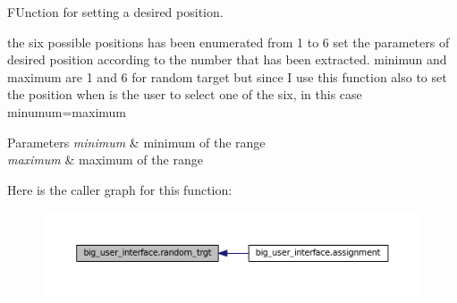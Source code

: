 F\+Unction for setting a desired position. 

the six possible positions has been enumerated from 1 to 6 set the parameters of desired position according to the number that has been extracted. minimun and maximum are 1 and 6 for random target but since I use this function also to set the position when is the user to select one of the six, in this case minumum=maximum 
\begin{DoxyParams}{Parameters}
{\em minimum} & minimum of the range \\
\hline
{\em maximum} & maximum of the range \\
\hline
\end{DoxyParams}


Here is the caller graph for this function\+:\nopagebreak
\begin{figure}[H]
\begin{center}
\leavevmode
\includegraphics[width=350pt]{namespacebig__user__interface_a76119123837eb23b6351dfa51682c794_icgraph}
\end{center}
\end{figure}


